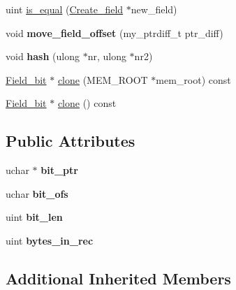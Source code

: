 \begin{DoxyCompactItemize}
\item 
uint \mbox{\hyperlink{classField__bit_a92ecc819aaa815e8bd059db03c17d680}{is\+\_\+equal}} (\mbox{\hyperlink{classCreate__field}{Create\+\_\+field}} $\ast$new\+\_\+field)
\item 
\mbox{\label{classField__bit_a57e4cb61be8a3d841b4000371bcce22f}} 
void {\bfseries move\+\_\+field\+\_\+offset} (my\+\_\+ptrdiff\+\_\+t ptr\+\_\+diff)
\item 
\mbox{\label{classField__bit_af2c718bf9b74d3d0433cd9a9136a6a2f}} 
void {\bfseries hash} (ulong $\ast$nr, ulong $\ast$nr2)
\item 
\mbox{\hyperlink{classField__bit}{Field\+\_\+bit}} $\ast$ \mbox{\hyperlink{classField__bit_aeb78600782993f9f9b6eb5b24de2e527}{clone}} (M\+E\+M\+\_\+\+R\+O\+OT $\ast$mem\+\_\+root) const
\item 
\mbox{\hyperlink{classField__bit}{Field\+\_\+bit}} $\ast$ \mbox{\hyperlink{classField__bit_a666845df221e87fbc65c725c232e4afd}{clone}} () const
\end{DoxyCompactItemize}
\subsection*{Public Attributes}
\begin{DoxyCompactItemize}
\item 
\mbox{\label{classField__bit_a00765a3acd1d323df71a12e9b9adc5e7}} 
uchar $\ast$ {\bfseries bit\+\_\+ptr}
\item 
\mbox{\label{classField__bit_a062c3796c0ee779367b5f9ea6f0cb509}} 
uchar {\bfseries bit\+\_\+ofs}
\item 
\mbox{\label{classField__bit_a5a932a7d7f26af5883dec3a45d29877c}} 
uint {\bfseries bit\+\_\+len}
\item 
\mbox{\label{classField__bit_aa6f85e7d09aaab2eb920722cb76605bf}} 
uint {\bfseries bytes\+\_\+in\+\_\+rec}
\end{DoxyCompactItemize}
\subsection*{Additional Inherited Members}


